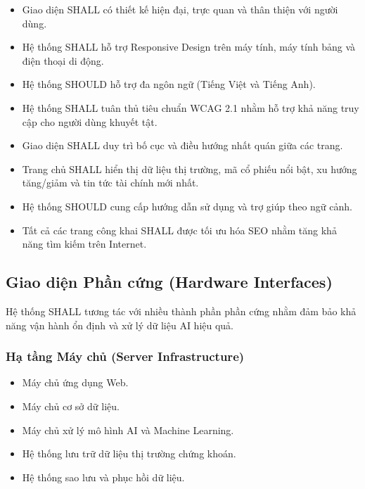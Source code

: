 \documentclass[12pt, a4paper]{article}
\begin{document}
\begin{itemize}
    \item Giao diện SHALL có thiết kế hiện đại, trực quan và thân thiện với người dùng.

    \item Hệ thống SHALL hỗ trợ Responsive Design trên máy tính, máy tính bảng và điện thoại di động.

    \item Hệ thống SHOULD hỗ trợ đa ngôn ngữ (Tiếng Việt và Tiếng Anh).

    \item Hệ thống SHALL tuân thủ tiêu chuẩn WCAG 2.1 nhằm hỗ trợ khả năng truy cập cho người dùng khuyết tật.

    \item Giao diện SHALL duy trì bố cục và điều hướng nhất quán giữa các trang.

    \item Trang chủ SHALL hiển thị dữ liệu thị trường, mã cổ phiếu nổi bật, xu hướng tăng/giảm và tin tức tài chính mới nhất.

    \item Hệ thống SHOULD cung cấp hướng dẫn sử dụng và trợ giúp theo ngữ cảnh.

    \item Tất cả các trang công khai SHALL được tối ưu hóa SEO nhằm tăng khả năng tìm kiếm trên Internet.
\end{itemize}


\subsection{Giao diện Phần cứng (Hardware Interfaces)}

Hệ thống SHALL tương tác với nhiều thành phần phần cứng nhằm đảm bảo khả năng vận hành ổn định và xử lý dữ liệu AI hiệu quả.


\subsubsection{Hạ tầng Máy chủ (Server Infrastructure)}
\begin{itemize}
    \item Máy chủ ứng dụng Web.

    \item Máy chủ cơ sở dữ liệu.

    \item Máy chủ xử lý mô hình AI và Machine Learning.

    \item Hệ thống lưu trữ dữ liệu thị trường chứng khoán.

    \item Hệ thống sao lưu và phục hồi dữ liệu.
\end{itemize}
\end{document}
